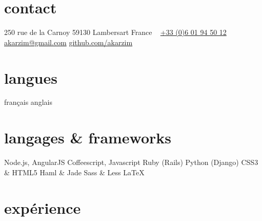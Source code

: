 \documentclass[]{cv} %
\begin{document}


\begin{aside} %
\section{contact}
\faHome{} 250 rue de la Carnoy
59130 Lambersart
France
~
\faPhone{} \href{tel:003360194501}{+33 (0)6 01 94 50 12}
~
\faEnvelope{} \href{mailto:akarzim@gmail.com}{akarzim@gmail.com}
\faGithub{} \href{https://github.com/akarzim}{github.com/akarzim}
\section{langues}
français
anglais
\section{langages \& frameworks}
{\color{red} \faStar} Node.js, AngularJS
Coffeescript, Javascript
Ruby (Rails)
Python (Django)
CSS3 \& HTML5
Haml \& Jade
Sass \& Less
\LaTeX{}
\end{aside}

\section{expérience}
\end{document}

